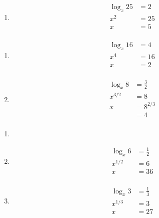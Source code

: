 \documentclass{exam}
\begin{document}
\begin{description}
\begin{enumerate}[a]
        \item 
          \begin{align*}
            \log_x 25     &= 2 \\
            x^2           &= 25 \\
            x             &= 5 \\
          \end{align*}
      \end{enumerate}

    \item[31]
      \begin{enumerate}[a]
        \item 
          \begin{align*}
            \log_x 16     &= 4 \\
            x^4           &= 16 \\
            x             &= 2 \\
          \end{align*}

        \item 
          \begin{align*}
            \log_x 8     &= \frac{3}{2} \\
            x^{3/2}      &= 8 \\
            x            &= 8^{2/3} \\
                         &= 4 \\
          \end{align*}
      \end{enumerate}

    \item[32]
      \begin{enumerate}[a]
        \item 
        \item 
          \begin{align*}
            \log_x 6     &= \frac{1}{2} \\
            x^{1/2}      &= 6 \\
            x            &= 36 \\
          \end{align*}

        \item 
          \begin{align*}
            \log_x 3     &= \frac{1}{3} \\
            x^{1/3}      &= 3 \\
            x            &= 27 \\
          \end{align*}
      \end{enumerate}


\end{description}
\end{document}
